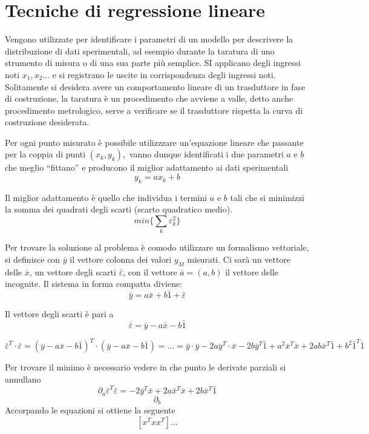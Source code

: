 
\section{Tecniche di regressione lineare}


Vengono utilizzate per identificare i parametri di un modello per descrivere la
distribuzione di dati sperimentali, ad esempio durante la taratura di uno
strumento di misura o di una sua parte più semplice. SI applicano degli
ingressi noti $x_1,x_2...$ e si registrano le uscite in corrispondenza degli
ingressi noti.
Solitamente si desidera avere un comportamento lineare di un trasduttore in
fase di costruzione, la taratura è un procedimento che avviene a valle, detto
anche procedimento metrologico, serve a verificare se il trasduttore rispetta
la curva di costruzione desiderata.

Per ogni punto misurato è possibile utilizzzare un'equazione lineare che
passante per la coppia di punti $(x_k,y_k),$ vanno dunque identificati i due
parametri $a$ e $b$ che meglio ``fittano'' e producono il miglior adattamento
ai dati sperimentali
$$
y_k = ax_k + b
$$

Il miglior adattamento è quello che individua i termini $a$ e $b$ tali che si
minimizzi la somma dei quadrati degli scarti (scarto quadratico medio).
$$
min\{\sum_{k}\varepsilon_k^2\}
$$

Per trovare la soluzione al problema è comodo utilizzare un formalismo
vettoriale, si definisce con $\bar{y}$ il vettore colonna dei valori $y_M$
misurati.
Ci sarà un vettore delle $\bar{x}$, un vettore degli scarti
$\bar{\varepsilon}$, con il vettore $\bar{a}=(a,b)$ il vettore delle incognite.
Il sistema in forma compatta diviene:
$$
\bar{y} = a\bar{x} + b\bar{1} + \bar{\varepsilon}
$$

Il vettore degli scarti è pari a
$$
\bar{\varepsilon} = \bar{y} - a\bar{x} - b\bar{1}
$$

$$
\bar\varepsilon^T\cdot\bar{\varepsilon} =
(\bar{y}-a\bar{x}-b\bar{1})^T\cdot(\bar{y}-a\bar{x}-b\bar{1}) = ... =
\bar{y}\cdot\bar{y} -2a\bar{y}^T\cdot\bar{x} - 2b\bar{y}^T\bar{1} +
a^2\bar{x}^T\bar{x} + 2ab\bar{x}^T\bar{1} + b^2\bar{1}^T\bar{1}
$$

Per trovare il minimo è necessario vedere in che punto le derivate parziali si
annullano
$$
\partial_a \bar{\varepsilon}^T\bar\varepsilon = -2\bar{y}^T\bar{x} +
2a\bar{x}^T\bar{x} + 2b\bar{x}^T\bar{1}
$$
$$
\partial_b
$$
Accorpando le equazioni si ottiene la seguente
$$
\left[ x^Tx x^T\right]...
$$


